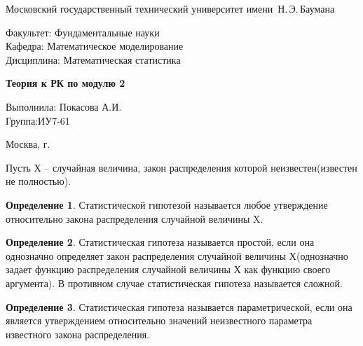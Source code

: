 \documentclass[a4paper, 12pt]{article}
\theoremstyle{definition}
\newtheorem{definition}{Определение}[section]
\theoremstyle{leads}
\theoremstyle{example}
\theoremstyle{remark}
\begin{document}
\begin{center}
	\Large
	Московский государственный технический университет имени~Н.\,Э.\,Баумана
\end{center}

\hfill\begin{minipage}{0.77\textwidth}
	{\large
		\noindent
		Факультет: Фундаментальные науки\\[2mm]
		\noindent
		Кафедра:  Математическое моделирование\\[2mm]
		\noindent
		Дисциплина: Математическая статистика 
		\vspace{1.5cm}}
\end{minipage}
\vfill

\begin{center}
	\Large
	\textbf{Теория к РК по модулю 2 \\}
\end{center}
\vfill

\hfill\begin{minipage}{0.35\textwidth}
	Выполнила: Покасова А.И.\\
	Группа:ИУ7-61 \\
\end{minipage}
\vfill

\begin{center}
	Москва, \the\year\space г.
\end{center}

\newpage
	Пусть Х -- случайная величина, закон распределения которой неизвестен(известен не полностью).
	\begin{definition}
		Статистической гипотезой называется любое утверждение относительно закона распределения случайной величины X.
	\end{definition}
	\begin{definition}
		Статистическая гипотеза называется простой, если она однозначно определяет закон распределения случайной величины Х(однозначно задает функцию распределения случайной величины Х как функцию своего аргумента). В противном случае статистическая гипотеза называется сложной.
	\end{definition}
    \begin{definition}
	    Статистическая гипотеза называется параметрической, если она является утверждением относительно значений неизвестного параметра известного закона распределения.	
    \end{definition}
\end{document}
